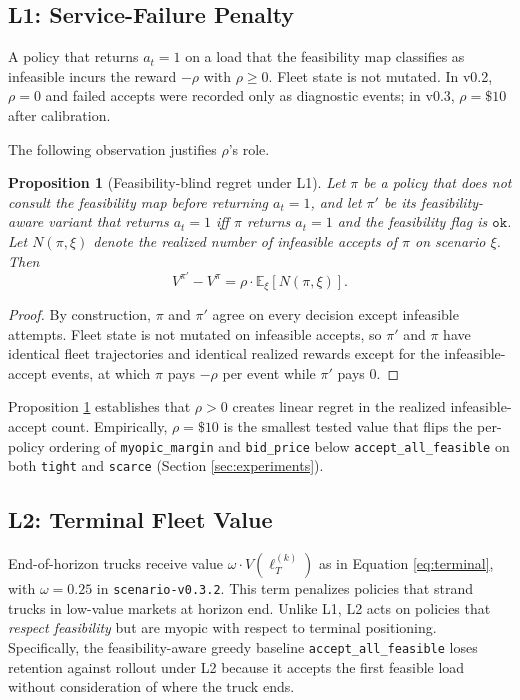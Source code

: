 \documentclass[11pt]{article}
\newtheorem{proposition}{Proposition}
\begin{document}
\subsection{L1: Service-Failure Penalty}

A policy that returns $a_t = 1$ on a load that the feasibility map
classifies as infeasible incurs the reward $-\rho$ with $\rho \geq 0$.
Fleet state is not mutated. In v0.2, $\rho = 0$ and failed accepts were
recorded only as diagnostic events; in v0.3, $\rho = \$10$ after
calibration.

The following observation justifies $\rho$'s role.

\begin{proposition}[Feasibility-blind regret under L1]
\label{prop:l1}
Let $\pi$ be a policy that does not consult the feasibility map before
returning $a_t = 1$, and let $\pi'$ be its feasibility-aware variant that
returns $a_t = 1$ iff $\pi$ returns $a_t = 1$ \emph{and} the feasibility
flag is $\texttt{ok}$. Let $N(\pi, \xi)$ denote the realized number of
infeasible accepts of $\pi$ on scenario $\xi$. Then
\begin{equation}
  V^{\pi'} - V^{\pi} = \rho \cdot \mathbb{E}_\xi[N(\pi, \xi)].
\end{equation}
\end{proposition}

\begin{proof}
By construction, $\pi$ and $\pi'$ agree on every decision except infeasible
attempts. Fleet state is not mutated on infeasible accepts, so $\pi'$ and
$\pi$ have identical fleet trajectories and identical realized rewards
except for the infeasible-accept events, at which $\pi$ pays $-\rho$ per
event while $\pi'$ pays $0$.
\end{proof}

Proposition \ref{prop:l1} establishes that $\rho > 0$ creates linear
regret in the realized infeasible-accept count. Empirically, $\rho = \$10$
is the smallest tested value that flips the per-policy ordering of
\texttt{myopic\_margin} and \texttt{bid\_price} below
\texttt{accept\_all\_feasible} on both \texttt{tight} and \texttt{scarce}
(Section \ref{sec:experiments}).

\subsection{L2: Terminal Fleet Value}

End-of-horizon trucks receive value $\omega \cdot V(\ell^{(k)}_T)$ as in
Equation \eqref{eq:terminal}, with $\omega = 0.25$ in
\texttt{scenario-v0.3.2}. This term penalizes policies that strand trucks
in low-value markets at horizon end. Unlike L1, L2 acts on policies that
\emph{respect feasibility} but are myopic with respect to terminal
positioning. Specifically, the feasibility-aware greedy baseline
\texttt{accept\_all\_feasible} loses retention against rollout under L2
because it accepts the first feasible load without consideration of where
the truck ends.
\end{document}
